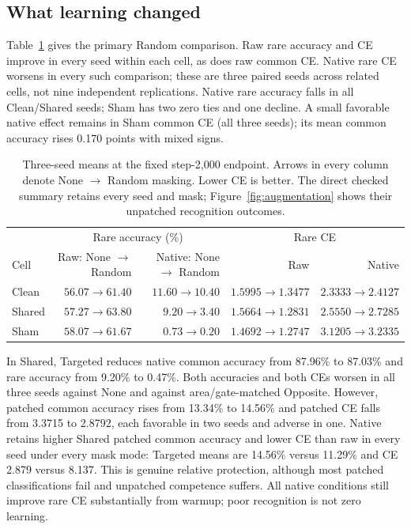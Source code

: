 \documentclass[10pt]{article}
\begin{document}
\subsection{What learning changed}
Table~\ref{tab:augmentation} gives the primary Random comparison. Raw rare accuracy and CE improve in every seed within each cell, as does raw common CE. Native rare CE worsens in every such comparison; these are three paired seeds across related cells, not nine independent replications. Native rare accuracy falls in all Clean/Shared seeds; Sham has two zero ties and one decline. A small favorable native effect remains in Sham common CE (all three seeds); its mean common accuracy rises 0.170 points with mixed signs.

\begin{table}[htbp]
\centering\small
\begin{tabular}{lrrrr}\toprule
& \multicolumn{2}{c}{Rare accuracy (\%)} & \multicolumn{2}{c}{Rare CE}\\
Cell & Raw: None $\to$ Random & Native: None $\to$ Random & Raw & Native\\\midrule
Clean & $56.07\to61.40$ & $11.60\to10.40$ & $1.5995\to1.3477$ & $2.3333\to2.4127$\\
Shared & $57.27\to63.80$ & $9.20\to3.40$ & $1.5664\to1.2831$ & $2.5550\to2.7285$\\
Sham & $58.07\to61.67$ & $0.73\to0.20$ & $1.4692\to1.2747$ & $3.1205\to3.2335$\\\bottomrule
\end{tabular}
\caption{Three-seed means at the fixed step-2,000 endpoint. Arrows in every column denote None $\to$ Random masking. Lower CE is better. The direct checked summary retains every seed and mask; Figure~\ref{fig:augmentation} shows their unpatched recognition outcomes.}
\label{tab:augmentation}
\end{table}

In Shared, Targeted reduces native common accuracy from 87.96\% to 87.03\% and rare accuracy from 9.20\% to 0.47\%. Both accuracies and both CEs worsen in all three seeds against None and against area/gate-matched Opposite. However, patched common accuracy rises from 13.34\% to 14.56\% and patched CE falls from 3.3715 to 2.8792, each favorable in two seeds and adverse in one. Native retains higher Shared patched common accuracy and lower CE than raw in every seed under every mask mode: Targeted means are 14.56\% versus 11.29\% and CE 2.879 versus 8.137. This is genuine relative protection, although most patched classifications fail and unpatched competence suffers. All native conditions still improve rare CE substantially from warmup; poor recognition is not zero learning.
\end{document}

